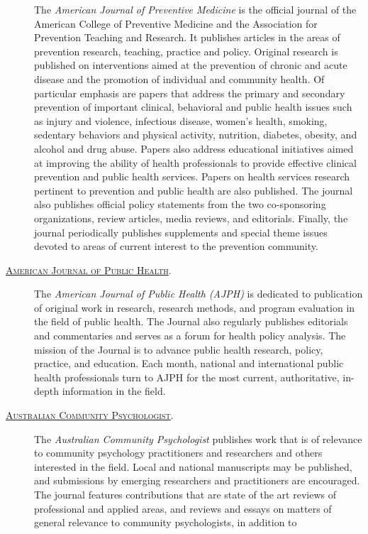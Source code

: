 \documentclass[]{tufte-handout}
\begin{document}
\begin{description}
The \emph{American Journal of Preventive Medicine} is the official
journal of the American College of Preventive Medicine and the
Association for Prevention Teaching and Research. It publishes articles
in the areas of prevention research, teaching, practice and policy.
Original research is published on interventions aimed at the prevention
of chronic and acute disease and the promotion of individual and
community health. Of particular emphasis are papers that address the
primary and secondary prevention of important clinical, behavioral and
public health issues such as injury and violence, infectious disease,
women's health, smoking, sedentary behaviors and physical activity,
nutrition, diabetes, obesity, and alcohol and drug abuse. Papers also
address educational initiatives aimed at improving the ability of health
professionals to provide effective clinical prevention and public health
services. Papers on health services research pertinent to prevention and
public health are also published. The journal also publishes official
policy statements from the two co-sponsoring organizations, review
articles, media reviews, and editorials. Finally, the journal
periodically publishes supplements and special theme issues devoted to
areas of current interest to the prevention community.
\item[\href{http://ajph.aphapublications.org/}{\textsc{American Journal of Public Health}}.]
The \emph{American Journal of Public Health (AJPH)} is dedicated to
publication of original work in research, research methods, and program
evaluation in the field of public health. The Journal also regularly
publishes editorials and commentaries and serves as a forum for health
policy analysis. The mission of the Journal is to advance public health
research, policy, practice, and education. Each month, national and
international public health professionals turn to AJPH for the most
current, authoritative, in-depth information in the field.
\item[\href{http://www.groups.psychology.org.au/ccom/publications/}{\textsc{Australian Community Psychologist}}.]
The \emph{Australian Community Psychologist} publishes work that is of
relevance to community psychology practitioners and researchers and
others interested in the field. Local and national manuscripts may be
published, and submissions by emerging researchers and practitioners are
encouraged. The journal features contributions that are state of the art
reviews of professional and applied areas, and reviews and essays on
matters of general relevance to community psychologists, in addition to

\end{description}
\end{document}
